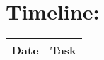 \section{Timeline:}

\begin{tabular}{|c|p{}|}
    \hline
    \textbf{Date} & \textbf{Task} \\
    \hline
\end{tabular}